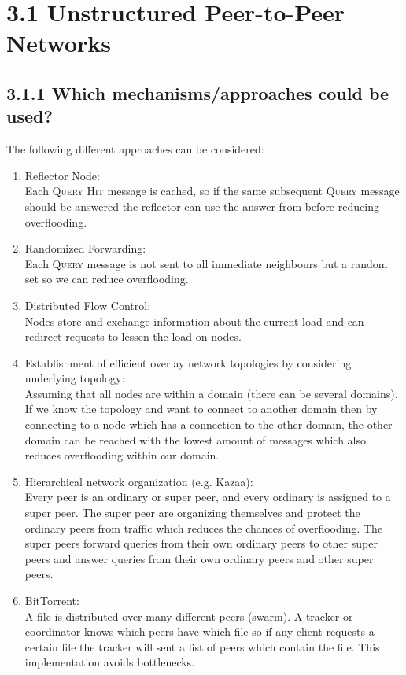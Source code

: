 \documentclass{article}
\begin{document}
	\pagestyle{fancy}
	\hfill
	
	\section*{3.1 Unstructured Peer-to-Peer Networks}
	\begin{adjustwidth}{2em}{2em}
		\subsection*{3.1.1 Which mechanisms/approaches could be used?}
		\begin{adjustwidth}{2em}{2em}
			The following different approaches can be considered:
			\begin{enumerate}
				\item Reflector Node: \\
				Each \textsc{Query Hit} message is cached, so if the same subsequent \textsc{Query} message should be answered the reflector can use the answer from before reducing overflooding.
				\item Randomized Forwarding: \\
				Each \textsc{Query} message is not sent to all immediate neighbours but a random set so we can reduce overflooding.
				\item Distributed Flow Control: \\
				Nodes store and exchange information about the current load and can redirect requests to lessen the load on nodes.
				\item Establishment of efficient overlay network topologies by considering underlying topology: \\
				Assuming that all nodes are within a domain (there can be several domains). If we know the topology and want to connect to another domain then by connecting to a node which has a connection to the other domain, the other domain can be reached with the lowest amount of messages which also reduces overflooding within our domain.
				\item Hierarchical network organization (e.g. Kazaa): \\
				Every peer is an ordinary or super peer, and every ordinary is assigned to a super peer. The super peer are organizing themselves and protect the ordinary peers from traffic which reduces the chances of overflooding. The super peers forward queries from their own ordinary peers to other super peers and answer queries from their own ordinary peers and other super peers.
				\item BitTorrent: \\
				A file is distributed over many different peers (swarm). A tracker or coordinator knows which peers have which file so if any client requests a certain file the tracker will sent a list of peers which contain the file. This implementation avoids bottlenecks.
			\end{enumerate}
		\end{adjustwidth}

\end{adjustwidth}
\end{document}
